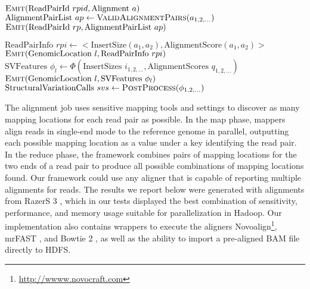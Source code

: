 \documentclass[11pt]{article}
\begin{document}
\algrenewcommand{}
  \begin{algorithmic}[1]
    \State $\textsc{Emit}(\textrm{ReadPairId }rpid, \textrm{Alignment }a)$
    \EndFor
    \EndFunction
    \State $\textrm{AlignmentPairList }ap \gets \textsc{ValidAlignmentPairs}(a_{1,2,\ldots})$
    \State $\textsc{Emit}(\textrm{ReadPairId }rp, \textrm{AlignmentPairList } ap)$
    \EndFunction
    \EndProcedure

    \State $ \textrm{ReadPairInfo }rpi \gets <\textrm{InsertSize}(a_1,a_2), \textrm{AlignmentScore}(a_1,a_2)>$
    \State $\textsc{Emit}(\textrm{GenomicLocation }l, \textrm{ReadPairInfo }rpi)$
    \EndFor
    \EndFor
    \EndFunction
    \State $\textrm{SVFeatures } \phi_l \gets \Phi(\textrm{InsertSizes }i_{1,2,\ldots}, \textrm{AlignmentScores }q_{1,2,\ldots})$
    \State $\textsc{Emit}(\textrm{GenomicLocation }l, \textrm{SVFeatures } \phi_l)$
    \EndFunction
    \EndProcedure
    \State $\textrm{StructuralVariationCalls } svs \gets \textsc{PostProcess}(\phi_{1,2,\ldots})$ 
  \end{algorithmic}

The alignment job uses sensitive mapping tools and settings to discover as many mapping locations for each read pair as possible. In the map phase, mappers align reads in single-end mode to the reference genome in parallel, outputting each possible mapping location as a value under a key identifying the read pair. In the reduce phase, the framework combines pairs of mapping locations for the two ends of a read pair to produce all possible combinations of mapping locations found. Our framework could use any aligner that is capable of reporting multiple alignments for reads. The results we report below were generated with alignments from RazerS 3 \autocite{Weese:2012by}, which in our tests displayed the best combination of sensitivity, performance, and memory usage suitable for parallelization in Hadoop. Our implementation also contains wrappers to execute the aligners Novoalign\footnote{\url{http://wwww.novocraft.com}}, mrFAST \autocite{Alkan:2009cr}, and Bowtie 2 \autocite{Langmead:2012jh}, as well as the ability to import a pre-aligned BAM file directly to HDFS.
\end{document}
